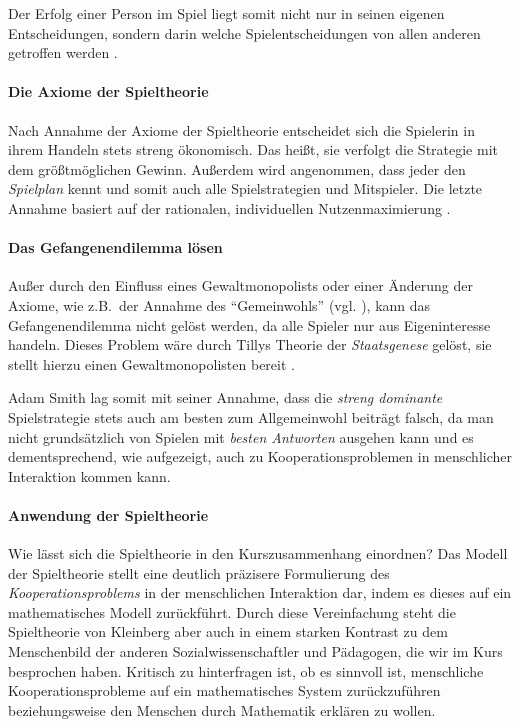 Der Erfolg einer Person im Spiel liegt somit nicht nur in seinen eigenen Entscheidungen, sondern darin welche Spielentscheidungen von allen anderen getroffen werden \parencite[vgl.][156]{Kleinberg-2009-oz}.


\paragraph{Die Axiome der Spieltheorie}

Nach Annahme der Axiome der Spieltheorie entscheidet sich die Spielerin in ihrem Handeln stets streng ökonomisch.
Das heißt, sie verfolgt die Strategie mit dem größtmöglichen Gewinn.
Außerdem wird angenommen, dass jeder den \emph{Spielplan} kennt und somit auch alle Spielstrategien und Mitspieler.
Die letzte Annahme basiert auf der rationalen, individuellen Nutzenmaximierung \parencite[vgl.][159]{Kleinberg-2009-oz}.


\paragraph{Das Gefangenendilemma lösen}

Außer durch den Einfluss eines Gewaltmonopolists oder einer Änderung der Axiome, wie z.B.\ der Annahme des ``Gemeinwohls'' (vgl. \citeauthor{rousseau-1762}), kann das Gefangenendilemma nicht gelöst werden, da alle Spieler nur aus Eigeninteresse handeln.
Dieses Problem wäre durch Tillys Theorie der \emph{Staatsgenese} gelöst, sie stellt hierzu einen Gewaltmonopolisten bereit \parencite{Tilly-1985-aa}.

Adam Smith lag somit mit seiner Annahme, dass die \emph{streng dominante} Spielstrategie stets auch am besten zum Allgemeinwohl beiträgt falsch, da man nicht grundsätzlich von Spielen mit \emph{besten Antworten} ausgehen kann und es dementsprechend, wie aufgezeigt, auch zu Kooperationsproblemen in menschlicher Interaktion kommen kann.


\paragraph{Anwendung der Spieltheorie}

Wie lässt sich die Spieltheorie in den Kurszusammenhang einordnen?
Das Modell der Spieltheorie stellt eine deutlich präzisere Formulierung des \emph{Kooperationsproblems} in der menschlichen Interaktion dar, indem es dieses auf ein mathematisches Modell zurückführt.
Durch diese Vereinfachung steht die Spieltheorie von Kleinberg aber auch in einem starken Kontrast zu dem Menschenbild der anderen Sozialwissenschaftler und Pädagogen, die wir im Kurs besprochen haben.
Kritisch zu hinterfragen ist, ob es sinnvoll ist, menschliche Kooperationsprobleme auf ein mathematisches System zurückzuführen beziehungsweise den Menschen durch Mathematik erklären zu wollen.
